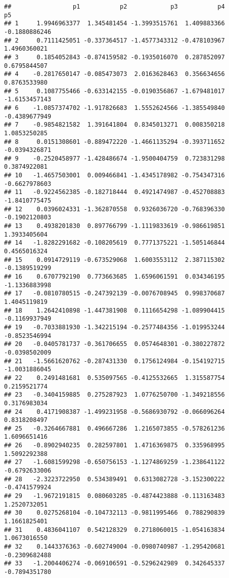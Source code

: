 \documentclass[
]{article}
\begin{document}
\begin{verbatim}
##                 p1           p2            p3           p4            p5
## 1     1.9946963377  1.345481454 -1.3993515761  1.409883366 -0.1880886246
## 2     0.7111425051 -0.337364517 -1.4577343312 -0.478103967  1.4960360021
## 3     0.1854052843 -0.874159582 -0.1935016070  0.287852097  0.6795844507
## 4    -0.2817650147 -0.085473073  2.0163628463  0.356634656  0.8763533980
## 5     0.1087755466 -0.633142155 -0.0190356867 -1.679481017 -1.6153457143
## 6    -1.0857374702 -1.917826683  1.5552624566 -1.385549840 -0.4389677949
## 7    -0.9854821582  1.391641804  0.8345013271  0.008350218  1.0853250285
## 8     0.0151308601 -0.889472220 -1.4661135294 -0.393711652 -0.0394326871
## 9    -0.2520458977 -1.428486674 -1.9500404759  0.723831298  0.3874922081
## 10   -1.4657503001  0.009466841 -1.4345178982 -0.754347316 -0.6627978603
## 11   -0.9224562385 -0.182718444  0.4921474987 -0.452708883 -1.8410775475
## 12    0.0396024331 -1.362870558  0.9326036720 -0.768396330 -0.1902120803
## 13    0.4938201830  0.897766799 -1.1119833619 -0.986619851  1.3933405604
## 14   -1.8282291682 -0.108205619  0.7771375221 -1.505146844  0.4565016324
## 15    0.0914729119 -0.673529068  1.6003553112  2.387115302 -0.1389519299
## 16    0.6707792190  0.773663685  1.6596061591  0.034346195 -1.1336883998
## 17   -0.0810780515 -0.247392139 -0.0076708945  0.998370687  1.4045119819
## 18    1.2642410898 -1.447381908  0.1116654298 -1.089904415 -0.1169937949
## 19   -0.7033881930 -1.342215194 -0.2577484356 -1.019953244 -0.8523546994
## 20   -0.0405781737 -0.361706655  0.0574648301 -0.380227872 -0.0398502009
## 21   -1.5661620762 -0.287431330  0.1756124984 -0.154192715 -1.0031886045
## 22    0.2491481681  0.535097565 -0.4125532665  1.315587754  0.2159521774
## 23   -0.3404159885  0.275287923  1.0776250700 -1.349218556  0.3176983034
## 24    0.4171908387 -1.499231958 -0.5686930792 -0.066096264  0.8318208497
## 25   -0.3264667881  0.496667286  1.2165073855 -0.578261236  1.6096651416
## 26   -0.8902940235  0.282597801  1.4716369875  0.335968995  1.5092292388
## 27   -1.6081599298 -0.650756153 -1.1274869259 -1.238641122 -0.6792633006
## 28   -2.3223722950  0.534389491  0.6313082728 -3.152300222 -0.4741579924
## 29   -1.9672191815  0.080603285 -0.4874423888 -0.113163483  1.2520732051
## 30    0.0275268104 -0.104732113 -0.9811995466  0.788290839  1.1661825401
## 31    0.4836041107  0.542128329  0.2718060015 -1.054163834  1.0673016550
## 32    0.1443376363 -0.602749004 -0.0980740987 -1.295420681 -0.2309682488
## 33   -1.2004406274 -0.069106591 -0.5296242989  0.342645337 -0.7894351780

\end{verbatim}
\end{document}

